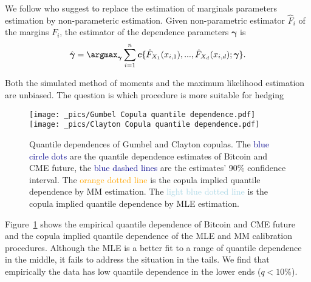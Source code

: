 
We follow \citet{genest1995semiparametric} who suggest to replace the estimation of marginals parameters estimation by non-parameteric estimation.
Given non-parametric estimator $\hat{F}_i$ of the margins $F_i$, the estimator of the dependence parameters $\bm{\gamma}$ is
\begin{equation*}
    \hat{\bm{\gamma}} = \argmax_{\bm{\gamma}} \sum_{i=1}^n \bm{c}\{ \hat{F}_{X_1}(x_{i,1}), ..., \hat{F}_{X_d}(x_{i,d});\bm{\gamma}\}.
    \end{equation*}

Both the simulated method of moments and the maximum likelihood
estimation are unbiased. 
The question is which procedure is more
suitable for hedging

\begin{figure}[h]
\texttt{[image: \_pics/Gumbel Copula quantile dependence.pdf]}
\texttt{[image: \_pics/Clayton Copula quantile dependence.pdf]}
  \caption{Quantile dependences of Gumbel and Clayton copulas. The
    \textcolor{darkblue}{blue circle dots} are the quantile dependence
    estimates of Bitcoin and CME future, the \textcolor{darkblue}{blue
      dashed lines} are the estimates' 90\% confidence interval. 
  The \textcolor{orange}{orange dotted line} is the copula implied
  quantile dependence by MM estimation. The
  \textcolor{lightblue}{light blue dotted line} is the copula implied
  quantile dependence by MLE estimation.  
  }
\label{fig:quantile dependence1}
\end{figure}

Figure~\ref{fig:quantile dependence1} shows the empirical quantile
dependence of Bitcoin and CME future and the copula implied quantile
dependence of the MLE and MM calibration procedures. 
Although the MLE is a better fit to a range of quantile dependence in
the middle, it fails to address the situation in the tails. 
We find that empirically the data has low quantile dependence in the
lower ends ($q<10\%$).  


